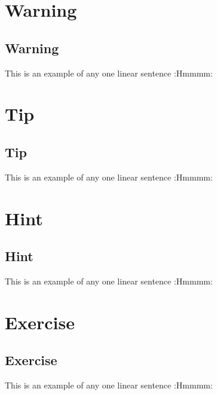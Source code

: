 \documentclass[11pt]{scrartcl}
\begin{document}
\section{Warning}
\begin{warning}
\lipsum[1]
\end{warning}

\subsection{Warning}
\begin{warning}
This is an example of any one linear sentence :Hmmmm:
\end{warning}
\newpage

\section{Tip}
\begin{tip}
\lipsum[1]
\end{tip}

\subsection{Tip}
\begin{tip}
This is an example of any one linear sentence :Hmmmm:
\end{tip}
\newpage

\section{Hint}
\begin{hint}
\lipsum[1]
\end{hint}


\subsection{Hint}
\begin{hint}
This is an example of any one linear sentence :Hmmmm:
\end{hint}
\newpage


\section{Exercise}
\begin{exercise}
\lipsum[1]
\end{exercise}


\subsection{Exercise}
\begin{exercise}
This is an example of any one linear sentence :Hmmmm:
\end{exercise}
\newpage
\end{document}
